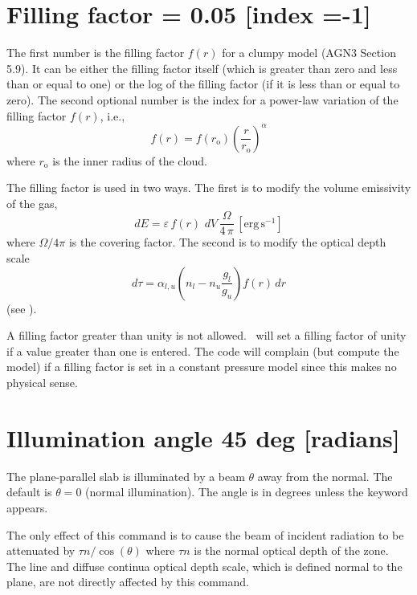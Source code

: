 \section{Filling factor = 0.05 [index =-1]}
\label{sec:CommandFillingFactor}

The first number is the filling factor $f(r)$ for a clumpy model (AGN3
Section 5.9).
It can be either the filling factor itself (which is greater
than zero and less than or equal to one) or the log of the filling factor
(if it is less than or equal to zero).
The second optional number is the
index  for a power-law variation of the filling factor $f(r)$, i.e.,
\begin{equation}
f\left( r \right) = f\left( {r_{\mathrm{o}} } \right)\left( {\frac{r}{{r_{\mathrm{o}}
}}} \right)^\alpha
\end{equation}
where $r_{\mathrm{o}}$ is the inner radius of the cloud.

The filling factor is used in two ways.  The first is to modify the volume
emissivity of the gas,
\begin{equation}
dE = \varepsilon \,f\left( r \right)\,\,dV\,\frac{\Omega }{{4\,\pi }}
\,[\mathrm{erg\, s}^{-1}]%
\end{equation}
where $\Omega/4\pi$ is the covering factor.
The second is to modify the optical depth scale
\begin{equation}
d\tau  = \alpha _{l,u} \left( {n_l  - n_u \frac{{g_l }}{{g_u }}}
\right)f\left( r \right)\,dr
\end{equation}
(see \citealp{Osterbrock1959}).

A filling factor greater than unity is not allowed.  \Cloudy\ will set
a filling factor of unity if a value greater than one is entered.   The
code will complain (but compute the model) if a filling factor is set in
a constant pressure model since this makes no physical sense.

\section{Illumination angle 45 deg [radians]}

The plane-parallel slab is illuminated by a beam $\theta $
away from the normal.
The default is $\theta  = 0$ (normal illumination).
The angle is in degrees unless
the keyword  appears.

The only effect of this command is to cause the beam of incident radiation
to be attenuated by $\tau n / \cos(\theta )$ where $\tau n$
is the normal optical depth of the zone.
The line and diffuse continua optical depth scale, which is
defined normal to the plane, are not directly affected by this command.

